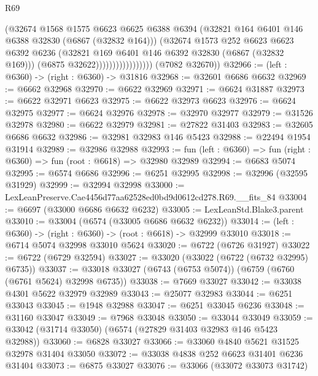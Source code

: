 \begin{lexlean}{R69}
\begin{coremodule}
{                                  (@32674
                                    @1568
                                    @1575
                                    @6623
                                    @6625
                                    @6388
                                    @6394
                                    (@32821 @164 @6401 @146 @6388 @32830 (@6867 (@32832 @164)))
                                    (@32674
                                      @1573
                                      @252
                                      @6623
                                      @6623
                                      @6392
                                      @6236
                                      (@32821 @169 @6401 @146 @6392 @32830 (@6867 (@32832 @169)))
                                      (@6875 @32622)))))))))))))))))
      (@7082 @32670))
@32966 := (left : @6360) -> (right : @6360) -> @31816
@32968 := @32601 @6686 @6632
@32969 := @6662 @32968
@32970 := @6622 @32969
@32971 := @6624 @31887
@32973 := @6622 @32971 @6623
@32975 := @6622 @32973 @6623
@32976 := @6624 @32975
@32977 := @6624 @32976
@32978 := @32970 @32977
@32979 := @31526 @32978
@32980 := @6622 @32979
@32981 := @27822 @31403
@32983 := @32605 @6686 @6632
@32986 := @32981 @32983 @146 @5423
@32988 := @22494 @1954 @31914
@32989 := @32986 @32988
@32993 := fun (left : @6360) => fun (right : @6360) => fun (root : @6618) => @32980 @32989
@32994 := @6683 @5074
@32995 := @6574 @6686
@32996 := @6251 @32995
@32998 := @32996 (@32595 @31929)
@32999 := @32994 @32998
@33000 := LexLeanPreserve.Cae4456d77aa62528ed0bd9d0612cd278.R69.__fits_84
@33004 := @6697 (@33000 @6686 @6632 @6232)
@33005 := LexLeanStd.Blake3.parent
@33010 := @33004 (@6574 (@33005 @6686 @6632 @6232))
@33014 := (left : @6360) -> (right : @6360) -> (root : @6618) -> @32999 @33010
@33018 := @6714 @5074 @32998 @33010 @5624
@33020 := @6722 (@6726 @31927)
@33022 := @6722 (@6729 @32594)
@33027 := @33020 (@33022 (@6722 (@6732 @32995) @6735))
@33037 := @33018 @33027 (@6743 (@6753 @5074)) (@6759 (@6760 (@6761 @5624) @32998 @6735))
@33038 := @7669 @33027
@33042 := @33038 @4301 @5622 @32979 @32989
@33043 := @25077 @32983
@33044 := @6251 @33043
@33045 := @1948 @32988
@33047 := @6251 @33045 @6236
@33048 := @31160 @33047
@33049 := @7968 @33048
@33050 := @33044 @33049
@33059 := @33042 (@31714 @33050) (@6574 (@27829 @31403 @32983 @146 @5423 @32988))
@33060 := @6828 @33027
@33066 := @33060 @4840 @5621 @31525 @32978 @31404 @33050
@33072 := @33038 @4838 @252 @6623 @31401 @6236 @31404
@33073 := @6875 @33027
@33076 := @33066 (@33072 @33073 @31742)
}
\end{coremodule}
\end{lexlean}
